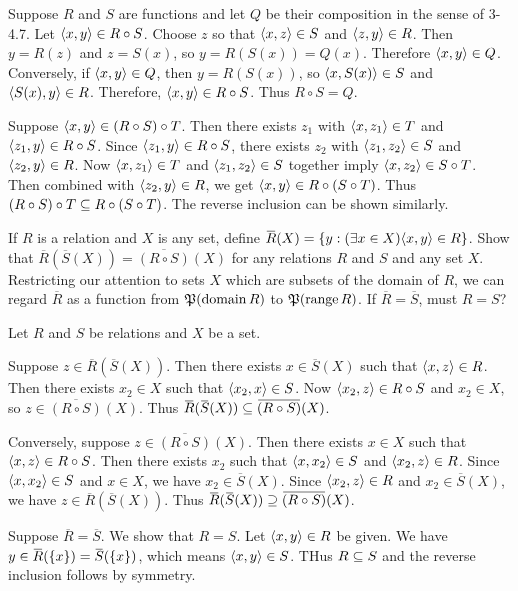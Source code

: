 \documentclass{report}
\begin{document}
\begin{solution}
Suppose $R$ and $S$ are functions and let $Q$ be their composition in the sense of 3-4.7.
Let $\left\langle x,y\right\rangle\in R\circ S$. Choose $z$ so that $\left\langle x,z\right\rangle\in S$ and $\left\langle z,y\right\rangle\in R$.
Then $y=R(z)$ and $z=S(x)$, so $y=R(S(x))=Q(x)$. Therefore $\left\langle x,y\right\rangle\in Q$.
Conversely, if $\left\langle x,y\right\rangle\in Q$, then $y=R(S(x))$, so $\left\langle x,S(x)\right\rangle\in S$ and $\left\langle S(x),y\right\rangle\in R$.
Therefore, $\left\langle x,y\right\rangle\in R\circ S$. Thus $R\circ S=Q$.

Suppose $\left\langle x, y\right\rangle\in (R\circ S)\circ T$. Then there exists $z_1$ with $\left\langle x,z_1\right\rangle\in T$
and $\left\langle z_1, y\right\rangle\in R\circ S$.
Since $\left\langle z_1, y\right\rangle\in R\circ S$, there exists $z_2$ with $\left\langle z_1,z_2\right\rangle\in S$ and $\left\langle z_2, y\right\rangle\in R$.
Now $\left\langle x,z_1\right\rangle\in T$ and $\left\langle z_1,z_2\right\rangle\in S$ together imply $\left\langle x,z_2\right\rangle\in S\circ T$.
Then combined with $\left\langle z_2, y\right\rangle\in R$, we get $\left\langle x, y\right\rangle\in R\circ(S\circ T)$.
Thus $(R\circ S)\circ T\subseteq R\circ(S\circ T)$.
The reverse inclusion can be shown similarly.
\end{solution}

\begin{exercise}
If $R$ is a relation and $X$ is any set, define $\overbar{R}(X) = \setb{y}{(\exists x \in X) \aprn{x, y} \in R}$.
Show that $\overbar{R}(\overbar{S}(X))=\overbar{(R\circ S)}(X)$ for any relations $R$ and $S$ and any set $X$.
Restricting our attention to sets $X$ which are subsets of the domain of $R$, we can regard $\overbar R$ as a function
from $\operatorname{\mathfrak{P}}(\operatorname{domain} R)$ to $\operatorname{\mathfrak{P}}(\operatorname{range} R)$. If $\overbar R = \overbar S$, must $R = S$?
\end{exercise}

\begin{solution}
Let $R$ and $S$ be relations and $X$ be a set.

Suppose $z\in \overbar{R}(\overbar{S}(X))$. Then there exists $x\in \overbar{S}(X)$ such that
$\left\langle x, z\right\rangle\in R$. Then there exists $x_2\in X$ such that $\left\langle x_2,x\right\rangle\in S$.
Now $\left\langle x_2, z\right\rangle\in R\circ S$ and $x_2\in X$, so $z\in\overbar{(R\circ S)}(X)$.
Thus $\overbar{R}(\overbar{S}(X))\sse \overbar{(R\circ S)}(X)$.

Conversely, suppose $z\in \overbar{(R\circ S)}(X)$. Then there exists $x\in X$ such that
$\left\langle x, z\right\rangle\in R\circ S$. Then there exists $x_2$ such that $\left\langle x,x_2\right\rangle\in S$ and
$\left\langle x_2,z\right\rangle\in R$.
Since $\left\langle x,x_2\right\rangle\in S$ and $x\in X$, we have $x_2\in\overbar{S}(X)$.
Since $\left\langle x_2,z\right\rangle\in R$ and $x_2\in\overbar{S}(X)$, we have $z\in\overbar{R}(\overbar{S}(X))$.
Thus $\overbar{R}(\overbar{S}(X))\Sse \overbar{(R\circ S)}(X)$.

Suppose $\overbar R=\overbar S$. We show that $R=S$.
Let $\left\langle x,y\right\rangle\in R$ be given. We have $y\in \overbar R(\set{x})=\overbar S(\set{x})$, which means
$\left\langle x,y\right\rangle\in S$. THus $R\subseteq S$ and the reverse inclusion follows by symmetry.
\end{solution}
\end{document}

